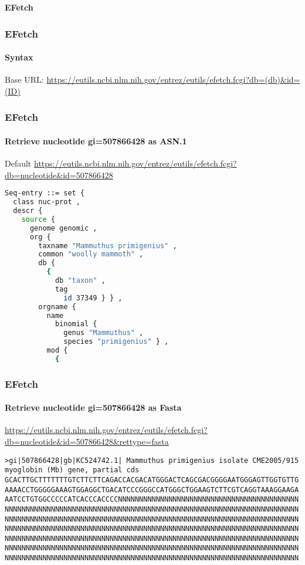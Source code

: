 \documentclass{beamer}
\newcommand{\centeredtitle}[1]{
\begin{center}
    \Huge{\bf{#1}}
\end{center}
}
\newcommand{\hugeslide}[1]{
\begin{frame}
\centeredtitle{#1}
\end{frame}
}
\begin{document}

\hugeslide{EFetch}


\begin{frame}[fragile]
\frametitle{EFetch}
\framesubtitle{Syntax}
Base URL:
\url{https://eutils.ncbi.nlm.nih.gov/entrez/eutils/efetch.fcgi?db=(db)\&id=(ID)}
\end{frame}

\begin{frame}[fragile]
\frametitle{EFetch}
\framesubtitle{Retrieve nucleotide gi=507866428 as ASN.1}

Default 
\url{https://eutils.ncbi.nlm.nih.gov/entrez/eutils/efetch.fcgi?db=nucleotide&id=507866428}
\begin{lstlisting}[language=bash,basicstyle=\tiny,breaklines=true]
Seq-entry ::= set {
  class nuc-prot ,
  descr {
    source {
      genome genomic ,
      org {
        taxname "Mammuthus primigenius" ,
        common "woolly mammoth" ,
        db {
          {
            db "taxon" ,
            tag
              id 37349 } } ,
        orgname {
          name
            binomial {
              genus "Mammuthus" ,
              species "primigenius" } ,
          mod {
            {

\end{lstlisting}
\end{frame}

\begin{frame}[fragile]
\frametitle{EFetch}
\framesubtitle{Retrieve nucleotide gi=507866428 as Fasta}
\url{https://eutils.ncbi.nlm.nih.gov/entrez/eutils/efetch.fcgi?db=nucleotide&id=507866428&rettype=fasta}
\begin{lstlisting}[basicstyle=\tiny,breaklines=true]
>gi|507866428|gb|KC524742.1| Mammuthus primigenius isolate CME2005/915 myoglobin (Mb) gene, partial cds
GCACTTGCTTTTTTTGTCTTCTTCAGACCACGACATGGGACTCAGCGACGGGGAATGGGAGTTGGTGTTG
AAAACCTGGGGGAAAGTGGAGGCTGACATCCCGGGCCATGGGCTGGAAGTCTTCGTCAGGTAAAGGAAGA
AATCCTGTGGCCCCCATCACCCACCCCNNNNNNNNNNNNNNNNNNNNNNNNNNNNNNNNNNNNNNNNNNN
NNNNNNNNNNNNNNNNNNNNNNNNNNNNNNNNNNNNNNNNNNNNNNNNNNNNNNNNNNNNNNNNNNNNNN
NNNNNNNNNNNNNNNNNNNNNNNNNNNNNNNNNNNNNNNNNNNNNNNNNNNNNNNNNNNNNNNNNNNNNN
NNNNNNNNNNNNNNNNNNNNNNNNNNNNNNNNNNNNNNNNNNNNNNNNNNNNNNNNNNNNNNNNNNNNNN
NNNNNNNNNNNNNNNNNNNNNNNNNNNNNNNNNNNNNNNNNNNNNNNNNNNNNNNNNNNNNNNNNNNNNN
NNNNNNNNNNNNNNNNNNNNNNNNNNNNNNNNNNNNNNNNNNNNNNNNNNNNNNNNNNNNNNNNNNNNNN
NNNNNNNNNNNNNNNNNNNNNNNNNNNNNNNNNNNNNNNNNNNNNNNNNNNNNNNNNNNNNNNNNNNNNN
\end{lstlisting}
\end{frame}
\end{document}
